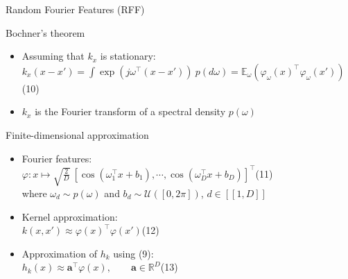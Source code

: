 \documentclass[9pt]{beamer}
\begin{document}
\begin{frame}{Random Fourier Features (RFF)}

\begin{block}{Bochner's theorem}
    \begin{itemize}
    \item Assuming that $k_x$ is stationary:\\
    \hfill$\displaystyle k_x(x-x')=\int\exp\left(j\omega^\top(x-x')\right)\:p(d\omega)=\mathbb{E}_\omega\left(\varphi_\omega(x)^\top\varphi_\omega(x')\right)$\hfill(10)
    \item$k_x$ is the Fourier transform of a spectral density $p(\omega)$
    \end{itemize}
\end{block}

\begin{block}{Finite-dimensional approximation}
    \begin{itemize}
    \item Fourier features:\\
    \hfill$\displaystyle\varphi:x\mapsto\sqrt{\tfrac{2}{D}}\:\left[\cos(\omega_1^\top x + b_1),\cdots,\cos(\omega_D^\top x + b_D)\right]^\top$\hfill(11)\vspace{2mm}\\
    where $\omega_d\sim p(\omega)$ and $b_d\sim \mathcal{U}([0, 2\pi])$, $d\in[\![1,D]\!]$
    \item Kernel approximation:\\
    \hfill$k(x,x')\approx\varphi(x)^\top\varphi(x')$\hfill(12)
    \item[$\Rightarrow$]Approximation of $h_k$ using (9):\\
    \hfill$\displaystyle h_k(x)\approx\mathbf{a}^\top\varphi(x),\qquad\mathbf{a}\in\mathbb{R}^D$\hfill(13)
    \end{itemize}
\end{block}

\end{frame}
\end{document}
